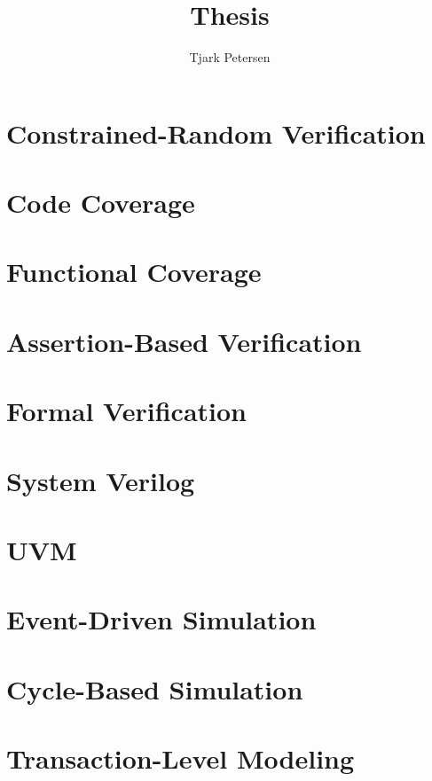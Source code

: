\documentclass[11pt]{article}
\author{Tjark Petersen}
\title{Thesis}
\begin{document}
\maketitle

\section{Constrained-Random Verification}

\section{Code Coverage}

\section{Functional Coverage}

\section{Assertion-Based Verification}

\section{Formal Verification}

\section{System Verilog}

\section{UVM}

\section{Event-Driven Simulation}

\section{Cycle-Based Simulation}

\section{Transaction-Level Modeling}
\end{document}
